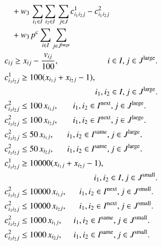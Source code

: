 \documentclass[a4j,11pt,twocolumn]{jsarticle}
\begin{document}
 \\
\begin{align}
&\hspace{0.85em} + w_3  \hspace{0.1em} \sum_{i_1\in I} \sum_{i_2\in I} \hspace{0.1em} \sum_{j \in J} {c_{i_1i_2j}^1} - {c_{i_1i_2j}^2} \notag \\
&\hspace{0.85em} + w_3 \hspace{0.1em} p^{\rm{c}} \sum_{i \in I} \sum_{j \in J^{\rm{large}}} \\
&{c_{ij}} \geq x_{ij} - \frac{v_{ij}} {100}, \hspace{5.78em} i \in I, j \in J^{\rm{large}}. \\
&{c^1_{i_1i_2j}} \geq 100 ({x_{i_1j}} + {x_{i_2j}} - 1), \notag \\
&\hspace{10.76em} {i_1},{i_2} \in I, j \in J^{\rm{large}}. \\
&{c^2_{i_1i_2j}} \leq 100 \hspace{0.15em}{x_{i_1j}}, \hspace{1.75em} {i_1},{i_2} \in I^{\rm{next}}, j \in J^{\rm{large}}. \\
&{c^2_{i_1i_2j}} \leq 100 \hspace{0.15em}{x_{i_2j}}, \hspace{1.75em} {i_1},{i_2} \in I^{\rm{next}}, j \in J^{\rm{large}}. \\
&{c^2_{i_1i_2j}} \leq 50 \hspace{0.15em}{x_{i_1j}}, \hspace{1.56em}  {i_1},{i_2} \in I^{\rm{same}}, j \in J^{\rm{large}}. \\
&{c^2_{i_1i_2j}} \leq 50 \hspace{0.15em}{x_{i_2j}}, \hspace{1.56em} {i_1},{i_2} \in I^{\rm{same}}, j \in J^{\rm{large}}. \\
&{c^1_{i_1i_2j}} \geq 10000 ({x_{i_1j}} + {x_{i_2j}} - 1), \notag \\
&\hspace{10.62em} {i_1},{i_2} \in I, j \in J^{\rm{small}}. \\
&{c^2_{i_1i_2j}} \leq 10000 \hspace{0.15em}{x_{i_1j}}, \hspace{1.5em} {i_1},{i_2} \in I^{\rm{next}}, j \in J^{\rm{small}}. \\
&{c^2_{i_1i_2j}} \leq 10000 \hspace{0.15em}{x_{i_2j}}, \hspace{1.5em} {i_1},{i_2} \in I^{\rm{next}}, j \in J^{\rm{small}}. \\
&{c^2_{i_1i_2j}} \leq 1000 \hspace{0.15em}{x_{i_1j}}, \hspace{1.32em} {i_1},{i_2} \in I^{\rm{same}}, j \in J^{\rm{small}}. \\
&{c^2_{i_1i_2j}} \leq 1000 \hspace{0.15em}{x_{i_2j}}, \hspace{1.32em} {i_1},{i_2} \in I^{\rm{same}}, j \in J^{\rm{small}}.
\end{align}
\end{document}
